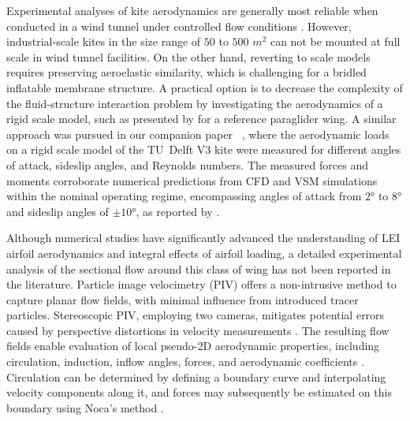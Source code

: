 \documentclass[wes, manuscript]{copernicus}
\begin{document}
Experimental analyses of kite aerodynamics are generally most reliable when conducted in a wind tunnel under controlled flow conditions \citep{DeWachter2008,Desai2024}. However, industrial-scale kites in the size range of $50$ to $500$ $\unit{m^2}$ can not be mounted at full scale in wind tunnel facilities. On the other hand, reverting to scale models requires preserving aeroelastic similarity, which is challenging for a bridled inflatable membrane structure. A practical option is to decrease the complexity of the fluid-structure interaction problem by investigating the aerodynamics of a rigid scale model, such as presented by \cite{Belloc2015} for a reference paraglider wing. A similar approach was pursued in our companion paper~ \citep{Poland2026a}, where the aerodynamic loads on a rigid scale model of the TU~Delft V3 kite were measured for different angles of attack, sideslip angles, and Reynolds numbers. The measured forces and moments corroborate numerical predictions from CFD and VSM simulations within the nominal operating regime, encompassing angles of attack from $2\unit{\degree}$ to $8\unit{\degree}$ and sideslip angles of $\pm10\unit{\degree}$, as reported by \cite{Cayon2025a}. 

Although numerical studies have significantly advanced the understanding of LEI airfoil aerodynamics and integral effects of airfoil loading, a detailed experimental analysis of the sectional flow around this class of wing has not been reported in the literature.
Particle image velocimetry (PIV) offers a non-intrusive method to capture planar flow fields, with minimal influence from introduced tracer particles.
Stereoscopic PIV, employing two cameras, mitigates potential errors caused by perspective distortions in velocity measurements \citep{Prasad2000}.
The resulting flow fields enable evaluation of local pseudo-2D aerodynamic properties, including circulation, induction, inflow angles, forces, and aerodynamic coefficients \citep{Fritz2024a}.
Circulation can be determined by defining a boundary curve and interpolating velocity components along it, and forces may subsequently be estimated on this boundary using Noca's method \citep{Noca1999}.
\end{document}
